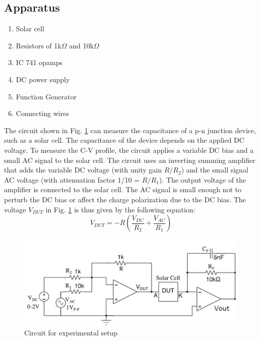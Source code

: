 \subsection*{Apparatus}

\begin{enumerate}
    \item Solar cell
    \item Resistors of 1k$\Omega$ and 10k$\Omega$
    \item IC 741 opamps
    \item DC power supply
    \item Function Generator 
    \item Connecting wires\\
\end{enumerate}

The circuit shown in Fig. \ref{th:1} can measure the capacitance of a p-n junction device, such as a solar cell. The capacitance of the device depends on the applied DC voltage. To measure the C-V profile, the circuit applies a variable DC bias and a small AC signal to the solar cell. The circuit uses an inverting summing amplifier that adds the variable DC voltage (with unity gain $R/R_2$) and the small signal AC voltage (with attenuation factor 1/10 = $R/R_1$). The output voltage of the amplifier is connected to the solar cell. The AC signal is small enough not to perturb the DC bias or affect the charge polarization due to the DC bias. The voltage $V_{DUT}$ in Fig. \ref{th:1} is thus given by the following equation:
	\begin{equation}
		V_{DUT}=-R\left(\frac{V_{DC}}{R_2}+\frac{V_{AC}}{R_1}\right)
		\label{eq:4}
	\end{equation}

	\begin{figure}
		\centering
		\includegraphics[width=1\columnwidth]{images/circuit.png}
		\caption{Circuit for experimental setup}
		\label{th:1}
	\end{figure}

